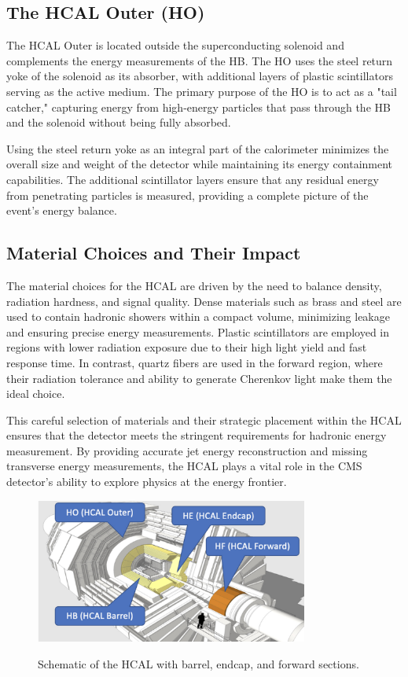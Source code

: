 \subsection{The HCAL Outer (HO)}
The HCAL Outer is located outside the superconducting solenoid and complements the energy measurements of the HB. The HO uses the steel return yoke of the solenoid as its absorber, with additional layers of plastic scintillators serving as the active medium. The primary purpose of the HO is to act as a "tail catcher," capturing energy from high-energy particles that pass through the HB and the solenoid without being fully absorbed.

Using the steel return yoke as an integral part of the calorimeter minimizes the overall size and weight of the detector while maintaining its energy containment capabilities. The additional scintillator layers ensure that any residual energy from penetrating particles is measured, providing a complete picture of the event's energy balance. \cite{hcal_tdr_outer}

\subsection{Material Choices and Their Impact}
The material choices for the HCAL are driven by the need to balance density, radiation hardness, and signal quality. Dense materials such as brass and steel are used to contain hadronic showers within a compact volume, minimizing leakage and ensuring precise energy measurements. Plastic scintillators are employed in regions with lower radiation exposure due to their high light yield and fast response time. In contrast, quartz fibers are used in the forward region, where their radiation tolerance and ability to generate Cherenkov light make them the ideal choice.

This careful selection of materials and their strategic placement within the HCAL ensures that the detector meets the stringent requirements for hadronic energy measurement. By providing accurate jet energy reconstruction and missing transverse energy measurements, the HCAL plays a vital role in the CMS detector's ability to explore physics at the energy frontier. \cite{hcal_cms_detector}

\begin{figure}[ht]
    \centering
    \includegraphics[width=0.8\textwidth]{Figures/HCAL.jpg} %
    \caption{Schematic of the HCAL with barrel, endcap, and forward sections.} \cite{hgcal_picture}
    \label{fig:hcal}
\end{figure}

